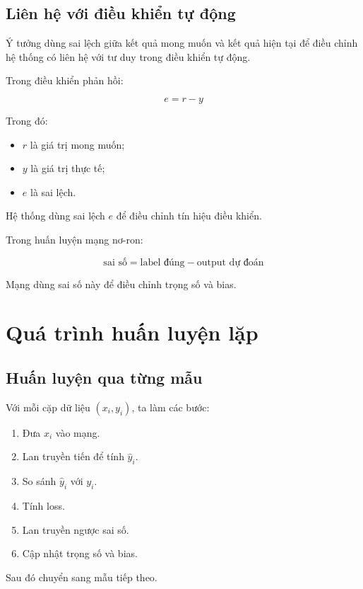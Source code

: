 \subsection{Liên hệ với điều khiển tự động}

Ý tưởng dùng sai lệch giữa kết quả mong muốn và kết quả hiện tại để điều chỉnh hệ thống có liên hệ với tư duy trong điều khiển tự động.

Trong điều khiển phản hồi:

\[
    e = r - y
\]

Trong đó:

\begin{itemize}
    \item $r$ là giá trị mong muốn;
    \item $y$ là giá trị thực tế;
    \item $e$ là sai lệch.
\end{itemize}

Hệ thống dùng sai lệch $e$ để điều chỉnh tín hiệu điều khiển.

Trong huấn luyện mạng nơ-ron:

\[
    \text{sai số} = \text{label đúng} - \text{output dự đoán}
\]

Mạng dùng sai số này để điều chỉnh trọng số và bias.

\section{Quá trình huấn luyện lặp}

\subsection{Huấn luyện qua từng mẫu}

Với mỗi cặp dữ liệu $(x_i,y_i)$, ta làm các bước:

\begin{enumerate}
    \item Đưa $x_i$ vào mạng.
    \item Lan truyền tiến để tính $\hat{y}_i$.
    \item So sánh $\hat{y}_i$ với $y_i$.
    \item Tính loss.
    \item Lan truyền ngược sai số.
    \item Cập nhật trọng số và bias.
\end{enumerate}

Sau đó chuyển sang mẫu tiếp theo.


